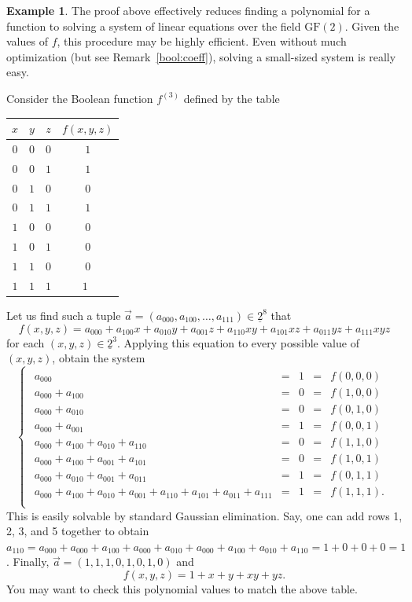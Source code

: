 \documentclass[12pt,notitlepage]{article}
\theoremstyle{plain}
\theoremstyle{definition}
\newtheorem{exm}[thm]{Example}
\theoremstyle{plain}
\newcommand{\ul}[1]{\underline{#1}}
\newcommand{\1}{\mathbf{1}}
\newcommand{\0}{\mathbf{0}}
\begin{document}
\begin{exm}
The proof above effectively reduces finding a polynomial for a function to solving a system of linear equations over the field $\mathrm{GF}(2)$. Given the values of $f$, this procedure may be highly efficient. Even without much optimization (but see Remark~\ref{bool:coeff}), solving a small-sized system is really easy.

Consider the Boolean function $f^{(3)}$ defined by the table
\begin{center}
\begin{tabular}{c c c | c }
$x$&$y$&$z$&$f(x,y,z)$\\
\hline
$0$&$0$&$0$&$1$\\
$0$&$0$&$1$&$1$\\
$0$&$1$&$0$&$0$\\
$0$&$1$&$1$&$1$\\

$1$&$0$&$0$&$0$\\
$1$&$0$&$1$&$0$\\
$1$&$1$&$0$&$0$\\
$1$&$1$&$1$&$1$\
\end{tabular}
\end{center}
Let us find such a tuple $\vec a = (a_{000}, a_{100}, \ldots, a_{111}) \in \ul{2}^8$ that 
$$f(x,y,z) = a_{000} + a_{100} x + a_{010} y + a_{001} z + a_{110} x y + a_{101} x z + a_{011} y z + a_{111} x y z$$
for each $(x,y,z) \in \ul{2}^3$. Applying this equation to every possible value of $(x,y,z)$, obtain the system
$$
\begin{cases}
\begin{array}{lcccr}
a_{000}  &=& 1 &=& f(0,0,0)\\
a_{000} + a_{100} &=& 0 &=& f(1,0,0)\\
a_{000} + a_{010} &=& 0 &=& f(0,1,0)\\
a_{000} + a_{001} &=& 1 &=& f(0,0,1)\\
a_{000} + a_{100} + a_{010} + a_{110} &=& 0 &=& f(1,1,0)\\
a_{000} + a_{100} + a_{001} + a_{101} &=& 0 &=& f(1,0,1)\\
a_{000} + a_{010} + a_{001} + a_{011} &=& 1 &=& f(0,1,1)\\
a_{000} + a_{100} + a_{010} + a_{001} + a_{110} + a_{101} + a_{011} + a_{111} &=& 1 &=& f(1,1,1).\\
\end{array}
\end{cases}
$$
This is easily solvable by standard Gaussian elimination. Say, one can add rows 1, 2, 3, and 5 together to obtain
$a_{110} = a_{000} + a_{000} + a_{100} + a_{000} + a_{010} + a_{000} + a_{100} + a_{010} + a_{110} = 1 + 0 + 0 + 0 = 1$.
Finally, $\vec a = (1, 1, 1, 0, 1, 0, 1, 0)$ and
$$f(x,y,z) = 1 + x + y + xy + yz.$$
You may want to check this polynomial values to match the above table.
\end{exm}
\end{document}
